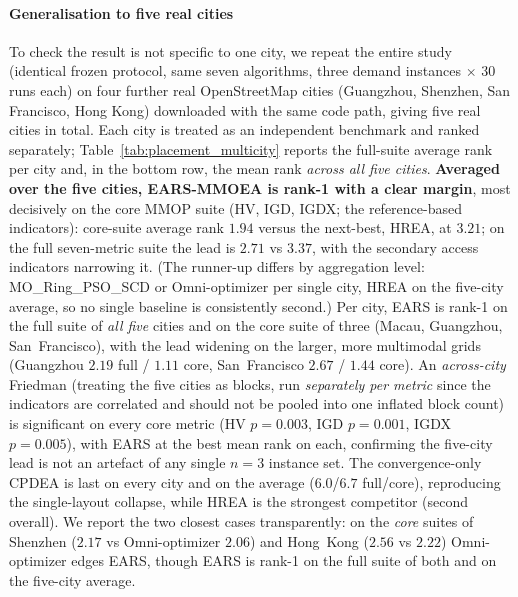 \paragraph{Generalisation to five real cities} To check the result is not specific to one
city, we repeat the entire study (identical frozen protocol, same seven algorithms, three
demand instances $\times$ 30 runs each) on four further real OpenStreetMap cities (Guangzhou,
Shenzhen, San Francisco, Hong Kong) downloaded with the same code path, giving five real
cities in total. Each city is treated as an independent benchmark and ranked separately;
Table~\ref{tab:placement_multicity} reports the full-suite average rank per city and, in the
bottom row, the mean rank \emph{across all five cities}. \textbf{Averaged over the five
cities, EARS-MMOEA is rank-1 with a clear margin}, most decisively on the core MMOP suite
(HV, IGD, IGDX; the reference-based indicators): core-suite average rank $1.94$ versus the
next-best, HREA, at $3.21$; on the full seven-metric suite the lead is $2.71$ vs $3.37$, with the
secondary access indicators narrowing it. (The runner-up differs by aggregation level:
MO\_Ring\_PSO\_SCD or Omni-optimizer per single city, HREA on the five-city average, so no single
baseline is consistently second.) Per city, EARS is rank-1 on the full suite of
\emph{all five} cities and on the core suite of three (Macau, Guangzhou, San~Francisco), with
the lead widening on the larger, more multimodal grids (Guangzhou $2.19$ full / $1.11$ core,
San~Francisco $2.67$ / $1.44$ core). An \emph{across-city} Friedman (treating the five cities as
blocks, run \emph{separately per metric} since the indicators are correlated and should not be
pooled into one inflated block count) is significant on every core metric (HV $p{=}0.003$, IGD
$p{=}0.001$, IGDX $p{=}0.005$), with EARS at the best mean rank
on each, confirming the five-city lead is not an artefact of any single $n{=}3$ instance
set. The convergence-only CPDEA is last on every city and on the average ($6.0$/$6.7$ full/core),
reproducing the single-layout collapse, while HREA is the strongest competitor (second
overall). We report the two closest cases transparently: on the \emph{core} suites of Shenzhen
($2.17$ vs Omni-optimizer $2.06$) and Hong~Kong ($2.56$ vs $2.22$) Omni-optimizer edges EARS,
though EARS is rank-1 on the full suite of both and on the five-city average.

